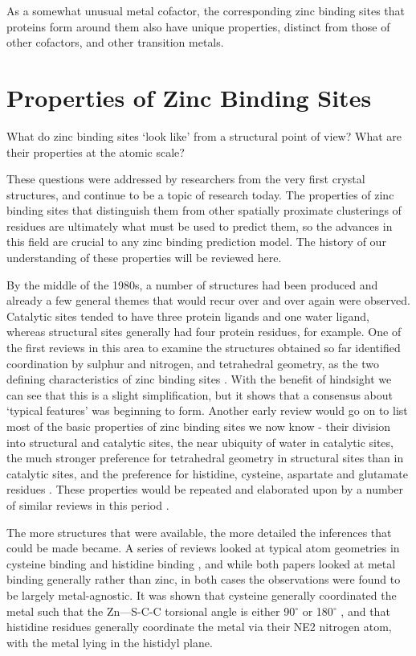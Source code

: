 As a somewhat unusual metal cofactor, the corresponding zinc binding sites that proteins form around them also have unique properties, distinct from those of other cofactors, and other transition metals.

\section{Properties of Zinc Binding Sites}

What do zinc binding sites `look like' from a structural point of view? What are their properties at the atomic scale?

These questions were addressed by researchers from the very first crystal structures, and continue to be a topic of research today. The properties of zinc binding sites that distinguish them from other spatially proximate clusterings of residues are ultimately what must be used to predict them, so the advances in this field are crucial to any zinc binding prediction model. The history of our understanding of these properties will be reviewed here.

By the middle of the 1980s, a number of structures had been produced and already a few general themes that would recur over and over again were observed. Catalytic sites tended to have three protein ligands and one water ligand, whereas structural sites generally had four protein residues, for example. One of the first reviews in this area to examine the structures obtained so far identified coordination by sulphur and nitrogen, and tetrahedral geometry, as the two defining characteristics of zinc binding sites \cite{williams1987biochemistry}. With the benefit of hindsight we can see that this is a slight simplification, but it shows that a consensus about `typical features' was beginning to form. Another early review would go on to list most of the basic properties of zinc binding sites we now know - their division into structural and catalytic sites, the near ubiquity of water in catalytic sites, the much stronger preference for tetrahedral geometry in structural sites than in catalytic sites, and the preference for histidine, cysteine, aspartate and glutamate residues \cite{vallee1990zinc}. These properties would be repeated and elaborated upon by a number of similar reviews in this period \cite{tainer1991metal,vallee1992functional,coleman1992zinc}.

The more structures that were available, the more detailed the inferences that could be made became. A series of reviews looked at typical atom geometries in cysteine binding \cite{chakrabarti1989geometry} and histidine binding \cite{chakrabarti1990geometry}, and while both papers looked at metal binding generally rather than zinc, in both cases the observations were found to be largely metal-agnostic. It was shown that cysteine generally coordinated the metal such that the Zn---S-C-C torsional angle is either 90$^\circ$ or 180$^\circ$ , and that histidine residues generally coordinate the metal via their NE2 nitrogen atom, with the metal lying in the histidyl plane.

